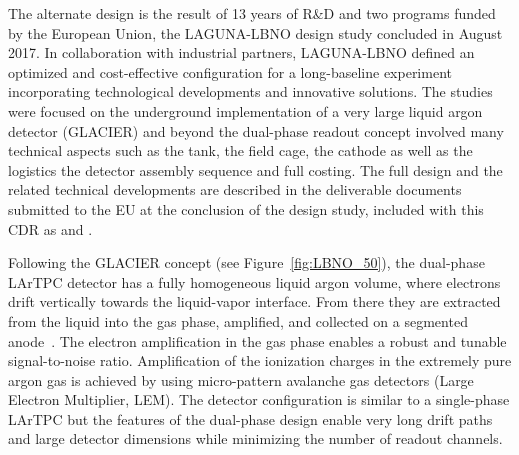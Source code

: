 The alternate design is the result of 13 years of R\&D and two programs funded by the European Union, the LAGUNA-LBNO design study concluded in August 2017.  In collaboration with industrial partners, LAGUNA-LBNO defined an optimized and cost-effective configuration for a long-baseline experiment incorporating technological developments and innovative solutions. The studies were focused on the underground implementation of a very large liquid argon detector (GLACIER) and beyond the dual-phase readout concept involved many technical aspects such as the tank, the field cage, the cathode as well as the logistics the detector assembly sequence and full costing. The full design and the related technical developments are described in the deliverable documents submitted to the EU at the conclusion of the design study, included with this CDR as \anxlbnoa and \anxlbnob.


Following the GLACIER concept  \cite{LAGUNA-LBNO-deliv} (see Figure~\ref{fig:LBNO_50}), the dual-phase LArTPC detector has a fully homogeneous liquid argon volume, where electrons drift vertically towards the liquid-vapor interface. From there they are extracted from the liquid into the gas phase, amplified, and collected on a segmented anode~\cite{Badertscher:2013wm,Badertscher:2012dq,Badertscher:2010zg}. The electron amplification in the gas phase 
enables a robust and tunable signal-to-noise ratio. Amplification of the ionization charges in the extremely pure argon gas is achieved by using micro-pattern avalanche gas detectors (Large Electron Multiplier, LEM). The detector configuration is similar to a single-phase LArTPC but the features of the dual-phase design enable very long drift paths and large detector dimensions while minimizing the number of readout channels.

